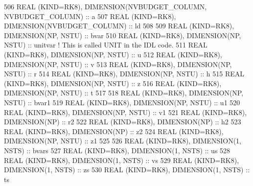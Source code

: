 \begin{DoxyCode}
506 \textcolor{keywordtype}{REAL (KIND=RK8)}, \textcolor{keywordtype}{DIMENSION(NVBUDGET\_COLUMN, NVBUDGET\_COLUMN)}              :: a
507 \textcolor{keywordtype}{REAL (KIND=RK8)}, \textcolor{keywordtype}{DIMENSION(NVBUDGET\_COLUMN)}                               :: ld
508 
509 \textcolor{keywordtype}{REAL (KIND=RK8)}, \textcolor{keywordtype}{DIMENSION(NP, NSTU)}                :: bvar
510 \textcolor{keywordtype}{REAL (KIND=RK8)}, \textcolor{keywordtype}{DIMENSION(NP, NSTU)}                :: unitvar                      \textcolor{comment}{! This is called UNIT
       in the IDL code.}
511 \textcolor{keywordtype}{REAL (KIND=RK8)}, \textcolor{keywordtype}{DIMENSION(NP, NSTU)}                :: u
512 \textcolor{keywordtype}{REAL (KIND=RK8)}, \textcolor{keywordtype}{DIMENSION(NP, NSTU)}                :: v
513 \textcolor{keywordtype}{REAL (KIND=RK8)}, \textcolor{keywordtype}{DIMENSION(NP, NSTU)}                :: r
514 \textcolor{keywordtype}{REAL (KIND=RK8)}, \textcolor{keywordtype}{DIMENSION(NP, NSTU)}                :: h
515 \textcolor{keywordtype}{REAL (KIND=RK8)}, \textcolor{keywordtype}{DIMENSION(NP, NSTU)}                :: z 
516 \textcolor{keywordtype}{REAL (KIND=RK8)}, \textcolor{keywordtype}{DIMENSION(NP, NSTU)}                :: t
517 
518 \textcolor{keywordtype}{REAL (KIND=RK8)}, \textcolor{keywordtype}{DIMENSION(NP, NSTU)}                :: bvar1
519 \textcolor{keywordtype}{REAL (KIND=RK8)}, \textcolor{keywordtype}{DIMENSION(NP, NSTU)}                :: u1
520 \textcolor{keywordtype}{REAL (KIND=RK8)}, \textcolor{keywordtype}{DIMENSION(NP, NSTU)}                :: v1
521 \textcolor{keywordtype}{REAL (KIND=RK8)}, \textcolor{keywordtype}{DIMENSION(NP)}                      :: r2
522 \textcolor{keywordtype}{REAL (KIND=RK8)}, \textcolor{keywordtype}{DIMENSION(NP)}                      :: h2
523 \textcolor{keywordtype}{REAL (KIND=RK8)}, \textcolor{keywordtype}{DIMENSION(NP)}                      :: z2
524 \textcolor{keywordtype}{REAL (KIND=RK8)}, \textcolor{keywordtype}{DIMENSION(NP, NSTU)}                :: z1
525 
526 \textcolor{keywordtype}{REAL (KIND=RK8)}, \textcolor{keywordtype}{DIMENSION(1, NSTS)}                 :: bvars
527 \textcolor{keywordtype}{REAL (KIND=RK8)}, \textcolor{keywordtype}{DIMENSION(1, NSTS)}                 :: us
528 \textcolor{keywordtype}{REAL (KIND=RK8)}, \textcolor{keywordtype}{DIMENSION(1, NSTS)}                 :: vs
529 \textcolor{keywordtype}{REAL (KIND=RK8)}, \textcolor{keywordtype}{DIMENSION(1, NSTS)}                 :: zs
530 \textcolor{keywordtype}{REAL (KIND=RK8)}, \textcolor{keywordtype}{DIMENSION(1, NSTS)}                 :: ts

\end{DoxyCode}
